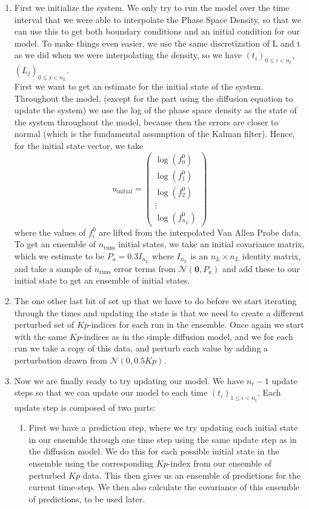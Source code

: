\documentclass[a4paper, fleqn]{article}
\begin{document}
\begin{enumerate}
    \item First we initialize the system. We only try to run the model over the time interval that we were able to interpolate the Phase Space Density, so that we can use this to get both boundary conditions and an initial condition for our model. To make things even easier, we use the same discretization of L and t as we did when we were interpolating the density, so we have $(t_i)_{0 \leq i < n_t}$, $(L_j)_{0 \leq j < n_L}$.\\
First we want to get an estimate for the initial state of the system. Throughout the model, (except for the part using the diffusion equation to update the system) we use the log of the phase space density as the state of the system throughout the model, because then the errors are closer to normal (which is the fundamental assumption of the Kalman filter).
Hence, for the initial state vector, we take 
\[u_{\text{initial}} = \begin{pmatrix}\log(f_0^0)\\\log(f_1^0)\\\log(f_2^0)\\\vdots\\\log(f_{n_L}^0)\end{pmatrix}\]
 where the values of $f_i^0$ are lifted from the interpolated Van Allen Probe data. To get an ensemble of $n_{\text{runs}}$ initial states, we take an initial covariance matrix, which we estimate to be $P_a=0.3I_{n_L}$ where $I_{n_L}$ is an $n_L \times n_L$ identity matrix, and take a sample of $n_{\text{runs}}$ error terms from $\mathcal{N}(\mathbf{0}, P_a)$ and add these to our initial state to get an ensemble of initial states.
    \item The one other last bit of set up that we have to do before we start iterating through the times and updating the state is that we need to create a different perturbed set of $Kp$-indices for each run in the ensemble. Once again we start with the same $Kp$-indices as in the simple diffusion model, and we for each run we take a copy of this data, and perturb each value by adding a perturbation drawn from $\mathcal{N}(0, 0.5Kp)$.
    \item Now we are finally ready to try updating our model. We have $n_t - 1$ update steps so that we can update our model to each time $(t_i)_{1 \leq i < n_t}$. Each update step is composed of two parts:
    \begin{enumerate}
        \item First we have a prediction step, where we try updating each initial state in our ensemble through one time step using the same update step as in the diffusion model. We do this for each possible initial state in the ensemble using the corresponding $Kp$-index from our ensemble of perturbed $Kp$ data. This then gives us an ensemble of predictions for the current time-step. We then also calculate the covariance of this ensemble of predictions, to be used later.

\end{enumerate}
\end{enumerate}
\end{document}
